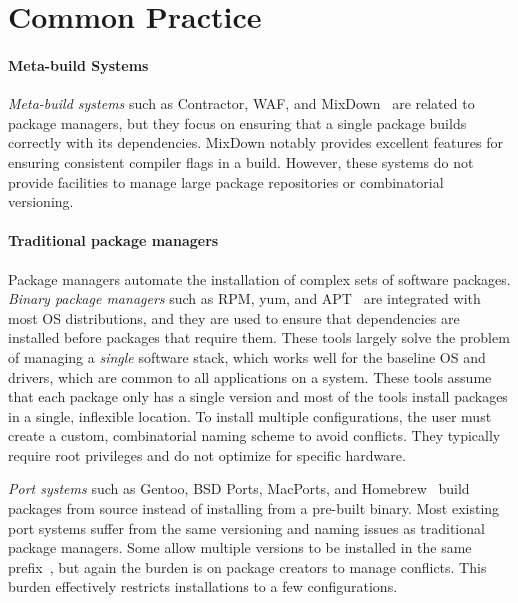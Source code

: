 
\section{Common Practice}
\label{sec:motivation}

\paragraph{Meta-build Systems}
{\it Meta-build systems} such as Contractor, WAF, and
MixDown~\cite{amundson:contractor,epperly+:mixdown,epperly+:mixdown-report,nagy:waf} are
related to package managers, but they focus on ensuring that a single
package builds correctly with its dependencies.  MixDown notably provides excellent
features for ensuring consistent compiler flags in a build.
However, these systems do not provide facilities to manage
large package repositories or combinatorial versioning.

\paragraph{Traditional package managers}
Package managers automate the installation of complex sets of software packages.
{\it Binary package managers} such as RPM, yum, and
APT~\cite{foster+:rpm03,silva:apt01,yum} are integrated with most
OS distributions, and they are used to ensure that dependencies
are installed before packages that require them.
These tools largely solve the problem of managing a {\it single} software
stack, which works well for the baseline OS and drivers, which are
common to all applications on a system.
These tools assume that each package only has a single version
and most of the tools install packages in a single, inflexible location.
To install multiple configurations, the user must create a custom, combinatorial
naming scheme to avoid conflicts. They typically require root
privileges and do not optimize for specific hardware.

{\it Port systems} such as Gentoo, BSD Ports, MacPorts, and
Homebrew~\cite{bsdports,groffen:gentoo-prefix,homebrew,macports,thiruvathukal:gentoo04}
build packages from source instead of installing from a pre-built binary.
Most existing port systems suffer from
the same versioning and naming issues as traditional package managers.
Some allow multiple versions to be installed in the same
prefix~\cite{groffen:gentoo-prefix}, but again the burden is on package
creators to manage conflicts. This burden effectively restricts installations
to a few configurations.


